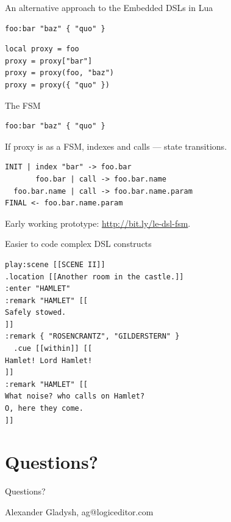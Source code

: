 \documentclass[handout]{beamer}
\begin{document}

\begin{frame}[fragile]{An alternative approach to the Embedded DSLs in Lua}

\begin{verbatim}
foo:bar "baz" { "quo" }
\end{verbatim}

\begin{verbatim}
local proxy = foo
proxy = proxy["bar"]
proxy = proxy(foo, "baz")
proxy = proxy({ "quo" })
\end{verbatim}

\end{frame}


\begin{frame}[fragile]{The FSM}

\begin{verbatim}
foo:bar "baz" { "quo" }
\end{verbatim}

If proxy is as a FSM, indexes and calls — state transitions.

\begin{verbatim}
INIT | index "bar" -> foo.bar
       foo.bar | call -> foo.bar.name
  foo.bar.name | call -> foo.bar.name.param
FINAL <- foo.bar.name.param
\end{verbatim}

Early working prototype: \url{http://bit.ly/le-dsl-fsm}.

\end{frame}


\begin{frame}[fragile]{Easier to code complex DSL constructs}

\begin{verbatim}
play:scene [[SCENE II]]
.location [[Another room in the castle.]]
:enter "HAMLET"
:remark "HAMLET" [[
Safely stowed.
]]
:remark { "ROSENCRANTZ", "GILDERSTERN" }
  .cue [[within]] [[
Hamlet! Lord Hamlet!
]]
:remark "HAMLET" [[
What noise? who calls on Hamlet?
O, here they come.
]]
\end{verbatim}

\end{frame}


\section{Questions?}


\begin{frame}{Questions?}

Alexander Gladysh,
ag@logiceditor.com

\end{frame}

\end{document}
